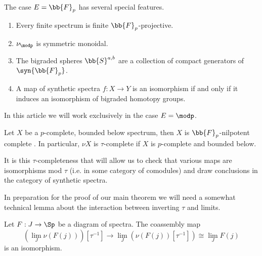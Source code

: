 \begin{rmk} 
    The case $E=\bb{F}_p$ has several special features.
    \begin{enumerate}
        \item Every finite spectrum is finite $\bb{F}_{p}$-projective. 
        \item $\nu_{\modp}$ is symmetric monoidal.
        \item The bigraded spheres $\bb{S}^{a,b}$ are a collection of compact generators of $\syn{\bb{F}_p}$.
        \item A map of synthetic spectra $f: X \rightarrow Y$ is an isomorphism if and only if it induces an isomorphism of bigraded homotopy groups.\hfill\qedhere
    \end{enumerate}
\end{rmk}

In this article we will work exclusively in the case $E = \modp$.






    













\begin{rmk}\label{rmktaucompl}
    Let $X$ be a $p$-complete, bounded below spectrum, then $X$ is $\bb{F}_p$-nilpotent complete \cite{bousfield1979localization}.
    In particular, $\nu X$ is $\tau$-complete if $X$ is $p$-complete and bounded below.
\end{rmk}

It is this $\tau$-completeness that will allow us to check that various maps are isomorphisms mod $\tau$ (i.e. in some category of comodules) and draw conclusions in the category of synthetic spectra.



In preparation for the proof of our main theorem we will need a somewhat technical lemma about the interaction between inverting $\tau$ and limits.

\begin{lem} \label{lem:lim-tau-invert-commute}
    Let $F : J \to \Sp$ be a diagram of spectra. The coassembly map 
    \[  \left( \lim_J \nu(F(j)) \right)[\tau^{-1}] \to \lim_J \left( \nu(F(j))[\tau^{-1}] \right) \cong \lim_J F(j) \]
    is an isomorphism.
\end{lem}

